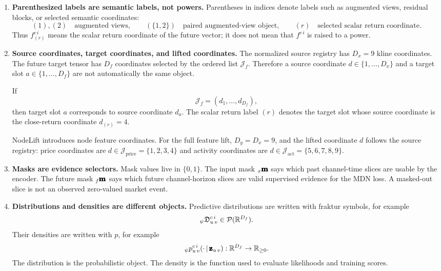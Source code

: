 \begin{enumerate}
  \item \textbf{Parenthesized labels are semantic labels, not powers.}
  Parentheses in indices denote labels such as augmented views, residual blocks,
  or selected semantic coordinates:
  \[
    (1),(2) \quad\text{augmented views},\qquad
    (\{1,2\}) \quad\text{paired augmented-view object},\qquad
    (r) \quad\text{selected scalar return coordinate}.
  \]
  Thus $f^{c\,i}_{(r)}$ means the scalar return coordinate of the future vector;
  it does not mean that $f^{c\,i}$ is raised to a power.

  \item \textbf{Source coordinates, target coordinates, and lifted coordinates.}
  The normalized source registry has $D_x=9$ kline coordinates.  The future
  target tensor has $D_f$ coordinates selected by the ordered list
  $\mathcal{J}_f$.  Therefore a source coordinate
  $d\in\{1,\ldots,D_x\}$ and a target slot
  $a\in\{1,\ldots,D_f\}$ are not automatically the same object.

  If
  \[
    \mathcal{J}_f=(d_1,\ldots,d_{D_f}),
  \]
  then target slot $a$ corresponds to source coordinate $d_a$.  The scalar
  return label $(r)$ denotes the target slot whose source coordinate is the
  close-return coordinate $d_{(r)}=4$.

  NodeLift introduces node feature coordinates.  For the full feature lift,
  $D_y=D_x=9$, and the lifted coordinate $d$ follows the source registry:
  price coordinates are
  $d\in\mathcal{J}_{\mathrm{price}}=\{1,2,3,4\}$ and activity coordinates are
  $d\in\mathcal{J}_{\mathrm{act}}=\{5,6,7,8,9\}$.

  \item \textbf{Masks are evidence selectors.}
  Mask values live in $\{0,1\}$.  The input mask ${}_{x}\pmb{\mathbf{m}}$ says which
  past channel-time slices are usable by the encoder.  The future mask
  ${}_{f}\pmb{\mathbf{m}}$ says which future channel-horizon slices are valid
  supervised evidence for the MDN loss.  A masked-out slice is not an observed
  zero-valued market event.

  \item \textbf{Distributions and densities are different objects.}
  Predictive distributions are written with fraktur symbols, for example
  \[
    {}_{\psi}\mathfrak{D}_{u\,v}^{c\,i}
    \in
    \mathcal{P}(\mathbb{R}^{D_f}).
  \]
  Their densities are written with $p$, for example
  \[
    {}_{\psi}p_{u\,v}^{c\,i}
    (\cdot\,\vert\,\pmb{\mathbf{z}}_{u\,v})
    :
    \mathbb{R}^{D_f}
    \rightarrow
    \mathbb{R}_{\ge 0}.
  \]
  The distribution is the probabilistic object.  The density is the function
  used to evaluate likelihoods and training scores.


\end{enumerate}
